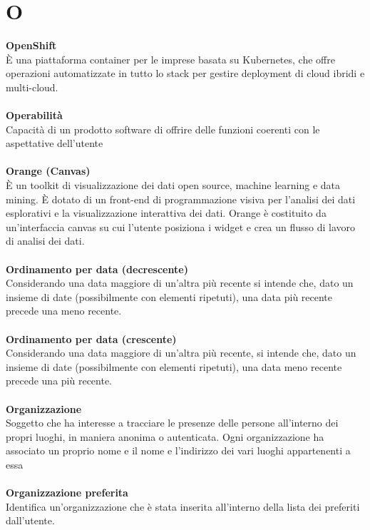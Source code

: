 \section{O}
\textbf{OpenShift}\\
È una piattaforma container per le imprese basata su Kubernetes, che offre operazioni automatizzate in tutto lo stack per gestire deployment di cloud ibridi e multi-cloud. \\ \\
\textbf{Operabilità}\\
Capacità di un prodotto software di offrire delle funzioni coerenti con le aspettative dell’utente \\ \\
\textbf{Orange (Canvas)}\\
È un toolkit di visualizzazione dei dati open source, machine learning e data mining. È dotato di un front-end di programmazione visiva per l'analisi dei dati esplorativi e la visualizzazione interattiva dei dati. Orange è costituito da un'interfaccia canvas su cui l'utente posiziona i widget e crea un flusso di lavoro di analisi dei dati. \\ \\
\textbf{Ordinamento per data (decrescente)}\\
Considerando una data maggiore di un'altra più recente si intende che, dato un insieme di date (possibilmente con elementi ripetuti), una data più recente precede una meno recente. \\ \\
\textbf{Ordinamento per data (crescente)}\\
Considerando una data maggiore di un'altra più recente, si intende che, dato un insieme di date (possibilmente con elementi ripetuti), una data meno recente precede una più recente. \\ \\
\textbf{Organizzazione}\\
Soggetto che ha interesse a tracciare le presenze delle persone all’interno dei propri luoghi, in maniera anonima o autenticata. Ogni organizzazione ha associato un proprio nome e il nome e l'indirizzo dei vari luoghi appartenenti a essa \\ \\
\textbf{Organizzazione preferita}\\
Identifica un'organizzazione che è stata inserita all'interno della lista dei preferiti dall'utente. \\ \\
\clearpage